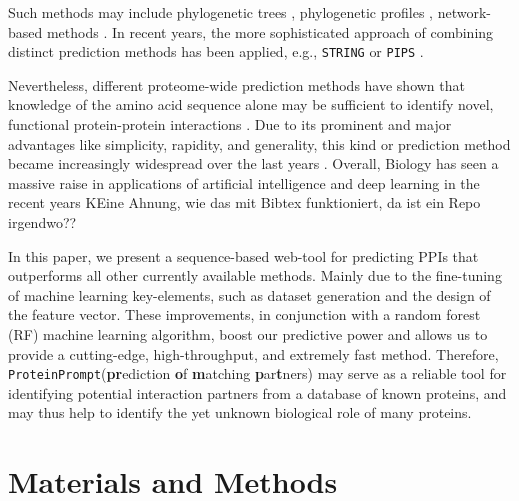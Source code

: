 \documentclass[preprint,3p,times,twocolumn]{elsarticle}
\newcommand{\TODO}[1] {\begingroup\color{red}#1\endgroup}
\newcommand{\tool}{\texttt{ProteinPrompt}\hspace{2pt}}
\begin{document}
Such methods may include phylogenetic trees
\cite{Pazos:2001}, phylogenetic profiles \cite{Barker:2005},
network-based methods \cite{Yook:2004, Clauset:2008}. In recent years,
the more sophisticated approach of combining distinct prediction
methods has been applied, e.g., \texttt{STRING} \cite{Szklarczyk:2011}
or \texttt{PIPS} \cite{McDowall:2009}.

Nevertheless, different proteome-wide prediction methods have shown
that knowledge of the amino acid sequence alone may be sufficient to identify novel,
functional protein-protein interactions \cite{Martin:2005,
  Shen:2007}. Due to its prominent and major advantages like simplicity, rapidity,
and generality, this kind or prediction method became increasingly
widespread over the last years \cite{Ofran:2003, Betel:2007, Liu:2012,
  Perovic:2017, Pan:2010}.
Overall, Biology has seen a massive raise in applications of artificial intelligence and deep learning in the recent years \cite{DOI:10.1098/rsif.2017.0387} \TODO{KEine Ahnung, wie das mit Bibtex funktioniert, da ist ein Repo irgendwo??}

In this paper, we present a sequence-based web-tool for predicting PPIs
that outperforms all other currently available methods. Mainly due to the
fine-tuning of machine learning key-elements, such as dataset generation and the design of the
feature vector. These improvements, in conjunction with a random forest
(RF) machine learning algorithm, boost our predictive power and allows us to provide a
cutting-edge, high-throughput, and extremely fast method. Therefore,
\tool (\textbf{pr}ediction \textbf{o}f \textbf{m}atching \textbf{p}ar\textbf{t}ners) may serve as a reliable tool for identifying potential
interaction partners from a database of known proteins, and may
thus help to identify the yet unknown biological role of many proteins.


\section{Materials and Methods}
\end{document}
